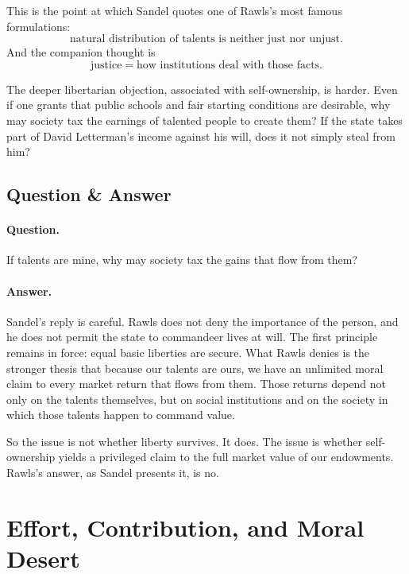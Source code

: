 This is the point at which Sandel quotes one of Rawls's most famous formulations:
\begin{equation}
\text{natural distribution of talents is neither just nor unjust}.
\end{equation}
And the companion thought is
\begin{equation}
\text{justice}=\text{how institutions deal with those facts}.
\end{equation}

The deeper libertarian objection, associated with self-ownership, is harder. Even if one grants that public schools and fair starting conditions are desirable, why may society tax the earnings of talented people to create them? If the state takes part of David Letterman's income against his will, does it not simply steal from him?

\subsection{Question \& Answer}

\paragraph{Question.} If talents are mine, why may society tax the gains that flow from them?

\paragraph{Answer.} Sandel's reply is careful. Rawls does not deny the importance of the person, and he does not permit the state to commandeer lives at will. The first principle remains in force: equal basic liberties are secure. What Rawls denies is the stronger thesis that because our talents are ours, we have an unlimited moral claim to every market return that flows from them. Those returns depend not only on the talents themselves, but on social institutions and on the society in which those talents happen to command value.

So the issue is not whether liberty survives. It does. The issue is whether self-ownership yields a privileged claim to the full market value of our endowments. Rawls's answer, as Sandel presents it, is no.

\section{Effort, Contribution, and Moral Desert}

